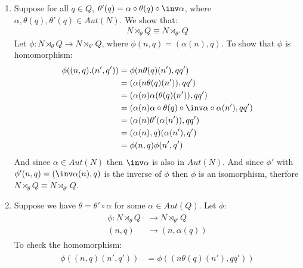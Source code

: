 \begin{enumerate}[label=\ilabel]
    \item 
        Suppose for all $q \in Q$, $\theta'(q) = \alpha \circ \theta(q) \circ \inv \alpha$, where $\alpha, \theta(q), \theta'(q) \in Aut(N)$. We show that:
        \begin{gather*}
            N \rtimes_\theta Q \equiv N \rtimes_{\theta'} Q
        \end{gather*}
        Let $\phi: N \rtimes_\theta Q \to N \rtimes_{\theta'} Q$, where $\phi(n, q) = (\alpha(n), q)$. To show that $\phi$ is homomorphism:
        \begin{gather*}
            \begin{split}
                \phi((n, q). (n', q')) & = \phi(n \theta(q)(n'), qq') \\
                &= (\alpha(n \theta(q)(n')), qq') \\
                & = (\alpha(n) \alpha(\theta(q)(n')), qq') \\
                & = (\alpha(n) \alpha \circ \theta(q) \circ \inv \alpha \circ \alpha(n'), qq') \\
                & = (\alpha(n) \theta'(\alpha(n')), qq') \\
                & = (\alpha(n), q) (\alpha(n'), q') \\
                & = \phi(n, q) \phi(n', q')
            \end{split}
        \end{gather*}
        And since $\alpha \in Aut(N)$ then $\inv \alpha$ is also in $Aut(N)$. And since $\phi'$ with $\phi'(n, q) = (\inv \alpha(n), q)$ is the inverse of $\phi$ then $\phi$ is an isomorphism, therfore $N \rtimes_\theta Q \equiv N \rtimes_{\theta'} Q$.
    \item
        Suppose we have $\theta = \theta' \circ \alpha$ for some $\alpha \in Aut(Q)$. Let $\phi$:
        \begin{gather*}
            \begin{split}
                \phi: N \rtimes_\theta Q & \to N \rtimes_{\theta'} Q \\
                (n, q) & \to (n, \alpha(q))
            \end{split}
        \end{gather*}
        To check the homomorphism:
        \begin{gather*}
            \begin{split}
                \phi((n, q)(n', q')) &= \phi((n \theta(q)(n'), qq')) \\

\end{split}
\end{gather*}
\end{enumerate}
